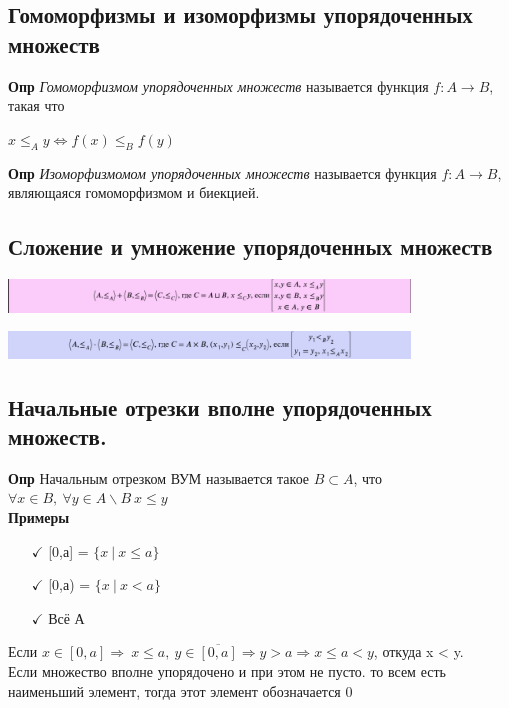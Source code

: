\subsection{Гомоморфизмы и изоморфизмы упорядоченных множеств}

\textbf{Опр} \textit{Гомоморфизмом упорядоченных множеств} называется функция $f:A\rightarrow B$, такая что
\begin{center}
    $x \leq_A y \Longleftrightarrow f(x) \leq_B f(y)$
\end{center}

\textbf{Опр} \textit{Изоморфизмомом  упорядоченных множеств} называется  функция $f:A\rightarrow B$, являющаяся гомоморфизмом и биекцией.

\subsection{Сложение и умножение упорядоченных множеств}

\includegraphics[width = 0.8\textwidth]{images/2 (определения)_m24.PNG}

\includegraphics[width = 0.8\textwidth]{images/2 (определения)_m25.PNG}

\subsection{Начальные отрезки вполне упорядоченных множеств.}
\textbf{Опр} Начальным отрезком ВУМ называется такое $B \subset A$, что $\forall x \in B, \ \forall y \in A \backslash B \ x \leq y$
\\
\textbf{Примеры}
\begin{itemize}
    \item [$\checkmark$] [0,а] = $\{x \ | \ x\leq a\}$
     \item [$\checkmark$][0,а) = $\{x \ | \ x<a\}$
      \item [$\checkmark$] Всё А
\end{itemize}
Если $x \in [0,a] \Longrightarrow \ x\leq a, \ y \in \overline{[0,a]} \Longrightarrow y > a \Longrightarrow x \leq a < y$, откуда x < y. \\
Если множество вполне упорядочено и при этом не пусто. то всем есть наименьший элемент, тогда этот элемент обозначается 0
\\
